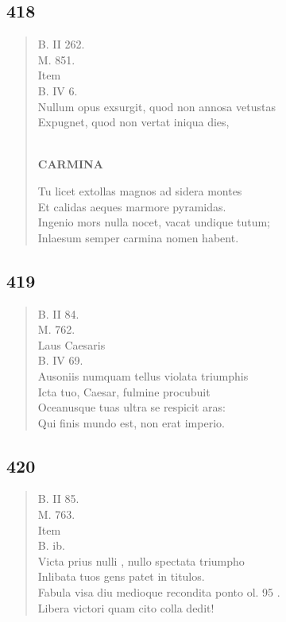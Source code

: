 \documentclass[11pt, a4paper]{report}
\begin{document}
            \subsection*{418}
      \begin{verse}
      B. II 262. \\ M. 851. \\  \lbrack Item \rbrack  \\ B. IV 6. \\ Nullum opus exsurgit, quod non annosa vetustas \\ Expugnet, quod non vertat iniqua dies, \\ 
        ﻿\pagebreak 
    \begin{center} \textbf{CARMINA} \end{center} \marginpar{[324]} Tu licet extollas magnos ad sidera montes \\ Et calidas aeques marmore pyramidas. \\ Ingenio mors nulla nocet, vacat undique tutum; \\ Inlaesum semper carmina nomen habent. \\ 
      \end{verse}
  
            \subsection*{419}
      \begin{verse}
      B. II 84. \\ M. 762. \\ Laus Caesaris \\ B. IV 69. \\ Ausoniis numquam tellus violata triumphis \\ Icta tuo, Caesar, fulmine procubuit \\ Oceanusque tuas ultra se respicit aras: \\ Qui finis mundo est, non erat imperio. \\ 
      \end{verse}
  
            \subsection*{420}
      \begin{verse}
      B. II 85. \\ M. 763. \\  \lbrack Item \rbrack  \\ B. ib. \\ Victa prius  \lbrack nulli \rbrack , nullo spectata triumpho \\ Inlibata tuos gens patet in titulos. \\ Fabula visa diu medioque recondita ponto ol. 95 . \\ Libera victori quam cito colla dedit! \\ 
      \end{verse}
  
\end{document}
